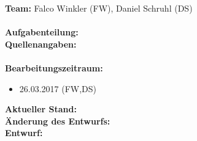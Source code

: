 \documentclass{scrreprt}
\begin{document}
\textbf{Team:} Falco Winkler (FW), Daniel Schruhl (DS)\\
\\
\textbf{Aufgabenteilung:}\\

\textbf{Quellenangaben:} \\
\\
\textbf{Bearbeitungszeitraum:}
\begin{itemize}
	\item 26.03.2017 (FW,DS)
\end{itemize}

\textbf{Aktueller Stand:}\\

\textbf{Änderung des Entwurfs:}\\

\textbf{Entwurf:}\\
\end{document}
